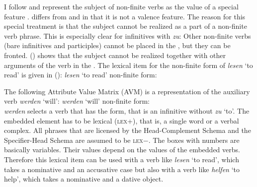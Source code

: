 \noindent
I follow
\citet[Section~3.1.1]{Kiss95a} and represent the subject of non-finite verbs as the value of a
special feature \subj. \subj differs from \spr and \comps in that it is not a valence feature. The
reason for this special treatment is that the subject cannot be realized as a part of a non-finite
verb phrase. This is especially clear for infinitives with \emph{zu}:
\eal
{}
\zl
Other non-finite verbs (bare infinitives and participles) cannot be placed in the \nf, but they
can be fronted. () shows that the subject cannot be realized together with other arguments
of the verb in the \vf.
\eal
{}
\zl
The lexical item for the non-finite form of \emph{lesen} `to read' is given in ():
\ea
\emph{lesen} `to read' non-finite form:\\
\z

\noindent
The following Attribute Value Matrix (AVM) is a representation of the auxiliary verb \emph{werden} `will':
\eas
\emph{werden} `will' non-finite form:\\
\zs
\emph{werden} selects a verb that has the  form, that is an infinitive without \emph{zu}
`to'. The embedded element has to be lexical (\textsc{lex}+), that is, a single word or a verbal
complex. All phrases that are licensed by the Head-Complement Schema and the Specifier-Head Schema
are assumed to be \textsc{lex}$-$.
The boxes with numbers are basically variables. Their values depend on the values of the
embedded verbs. Therefore this lexical item can be used with a verb like \emph{lesen} `to read',
which takes a nominative and an accusative case but also with a verb like \emph{helfen} `to help',
which takes a nominative and a dative object.

